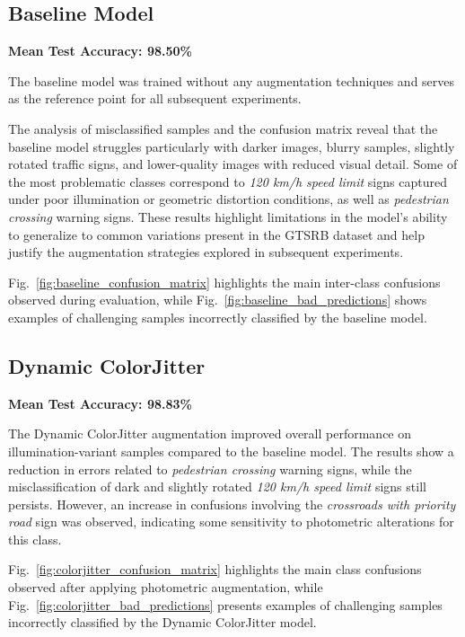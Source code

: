 \documentclass[conference]{IEEEtran}
\begin{document}
\subsection{Baseline Model}

\textbf{Mean Test Accuracy: 98.50\%}

The baseline model was trained without any augmentation techniques and serves as the reference point for all subsequent experiments.

The analysis of misclassified samples and the confusion matrix reveal that the baseline model struggles particularly with darker images, blurry samples, slightly rotated traffic signs, and lower-quality images with reduced visual detail. Some of the most problematic classes correspond to \textit{120 km/h speed limit} signs captured under poor illumination or geometric distortion conditions, as well as \textit{pedestrian crossing} warning signs. These results highlight limitations in the model’s ability to generalize to common variations present in the GTSRB dataset and help justify the augmentation strategies explored in subsequent experiments.

Fig.~\ref{fig:baseline_confusion_matrix} highlights the main inter-class confusions observed during evaluation, while Fig.~\ref{fig:baseline_bad_predictions} shows examples of challenging samples incorrectly classified by the baseline model. 






\subsection{Dynamic ColorJitter}

\textbf{Mean Test Accuracy: 98.83\%}

The Dynamic ColorJitter augmentation improved overall performance on illumination-variant samples compared to the baseline model. The results show a reduction in errors related to \textit{pedestrian crossing} warning signs, while the misclassification of dark and slightly rotated \textit{120 km/h speed limit} signs still persists. However, an increase in confusions involving the \textit{crossroads with priority road} sign was observed, indicating some sensitivity to photometric alterations for this class.

Fig.~\ref{fig:colorjitter_confusion_matrix} highlights the main class confusions observed after applying photometric augmentation, while Fig.~\ref{fig:colorjitter_bad_predictions} presents examples of challenging samples incorrectly classified by the Dynamic ColorJitter model.
\end{document}
